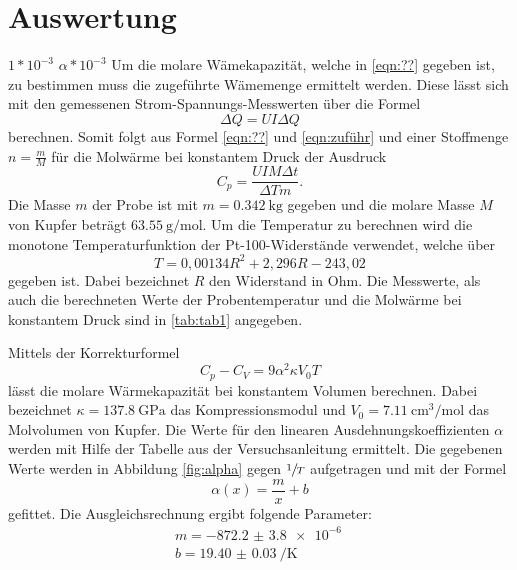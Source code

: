 \section{Auswertung}
\label{sec:Auswertung}
$1*10^{-3}$
$\alpha*10^{-3}$
Um die molare Wämekapazität, welche in \ref{eqn:??} gegeben ist, zu bestimmen muss die zugeführte
Wämemenge ermittelt werden. Diese lässt sich mit den gemessenen Strom-Spannungs-Messwerten über
die Formel
\begin{equation}
  \Delta Q = UI\Delta Q
  \label{eqn:zuführ}
\end{equation}
berechnen.
Somit folgt aus Formel \ref{eqn:??} und \ref{eqn:zuführ} und einer Stoffmenge $n=\frac{m}{M}$
für die Molwärme bei konstantem Druck der Ausdruck
\begin{equation}
  C_p=\frac{UIM\Delta t}{\Delta T m}.
  \label{eqn:Cp}
\end{equation}
Die Masse $m$ der Probe ist mit $m=\SI{0.342}{\kg}$ gegeben und die molare Masse $M$ von
Kupfer beträgt $\SI{63.55}{\g\per\mol}$.
Um die Temperatur zu berechnen wird die monotone Temperaturfunktion der
Pt-100-Widerstände verwendet, welche über
\begin{equation}
  T=0,00134R^2 + 2,296R - 243,02
  \label{eqn:Pt100}
\end{equation}
gegeben ist. Dabei bezeichnet $R$ den Widerstand in Ohm.
Die Messwerte, als auch die berechneten Werte der Probentemperatur und die
Molwärme bei konstantem Druck sind in \ref{tab:tab1} angegeben.


Mittels der Korrekturformel
\begin{equation}
  C_p - C_V= 9\alpha^2\kappa V_0 T
  \label{eqn:korrektur}
\end{equation}
lässt die molare Wärmekapazität bei konstantem Volumen berechnen. Dabei bezeichnet
$\kappa=\SI{137.8}{\giga\Pa}$ das Kompressionsmodul und $V_0=\SI{7.11}{\cm^3\per\mol}$
das Molvolumen von Kupfer. Die Werte für den linearen Ausdehnungskoeffizienten $\alpha$
werden mit Hilfe der Tabelle aus der Versuchsanleitung \cite{skript} ermittelt.
Die gegebenen Werte werden in Abbildung \ref{fig:alpha} gegen $\sfrac{1}{T}$
aufgetragen und mit der Formel
\begin{equation}
  \alpha(x)= \frac{m}{x}+b
\end{equation}
gefittet. Die Ausgleichsrechnung ergibt folgende Parameter:
\begin{align}
  m = \SI{-872.2(38)e-6}{}\\
  b = \SI{19.40(3)}{\per\K}
\end{align}


